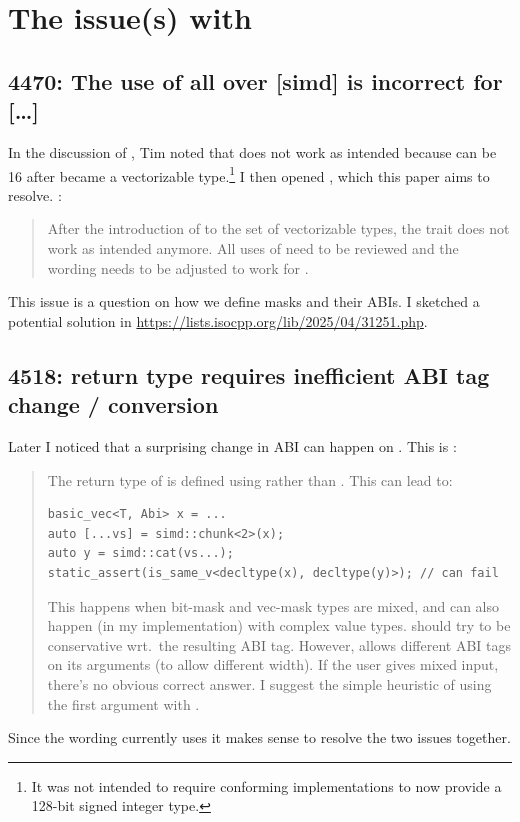\pagestyle{scrheadings}


%

\section{The issue(s) with }

\subsection{4470: The use of  all over [simd] is incorrect for
[\ldots]}

In the discussion of , Tim noted that
 does not work as intended because  can be 16 after
 became a vectorizable type.\footnote{It was not intended to require
conforming implementations to now provide a 128-bit signed integer type.}
I then opened , which this paper aims to resolve.
:
\begin{quote}
  After the introduction of  to the set of vectorizable types, the
   trait does not work as intended anymore.
  All uses of  need to be reviewed and the wording needs to be adjusted to
  work for .
\end{quote}

This issue is a question on how we define masks and their ABIs.
I sketched a potential solution in \url{https://lists.isocpp.org/lib/2025/04/31251.php}.

\subsection{4518:  return type requires inefficient ABI tag change / conversion}

Later I noticed that a surprising change in ABI can happen on \stdsimd{}.
This is :
\begin{quote}
  The return type of  is defined using  rather than
  .
  This can lead to:

  \begin{lstlisting}
basic_vec<T, Abi> x = ...
auto [...vs] = simd::chunk<2>(x);
auto y = simd::cat(vs...);
static_assert(is_same_v<decltype(x), decltype(y)>); // can fail
  \end{lstlisting}

  This happens when bit-mask and vec-mask types are mixed, and can also happen (in my
  implementation) with complex value types.
   should try to be conservative wrt.\ the resulting ABI tag.
  However,  allows different ABI tags on its arguments (to allow different width).
  If the user gives mixed input, there's no obvious correct answer.
  I suggest the simple heuristic of using the first argument with .
\end{quote}
Since the  wording currently uses  it makes sense to resolve
the two issues together.

